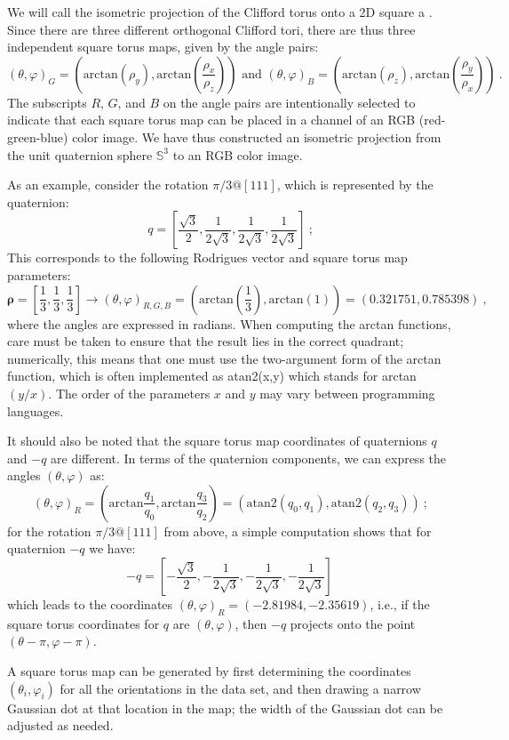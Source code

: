 We will call the isometric projection of the Clifford torus onto a 2D square a .  Since there are three different orthogonal Clifford tori, there are thus three independent square torus maps, given by the angle pairs:
\begin{equation}
	(\theta,\varphi)_G = \left(\text{arctan}(\rho_y), \text{arctan}\left(\frac{\rho_x}{\rho_z}\right)\right)\text{ and }(\theta,\varphi)_B = \left(\text{arctan}(\rho_z), \text{arctan}\left(\frac{\rho_y}{\rho_x}\right)\right)\ .
\end{equation}
The subscripts $R$, $G$, and $B$ on the angle pairs are intentionally selected to indicate that each square torus map can be placed in a channel of an RGB (red-green-blue) color image. We have thus constructed an isometric projection from the unit quaternion sphere $\mathbb{S}^3$ to an RGB color image.

As an example, consider the rotation $\pi/3@[111]$, which is represented by the quaternion:
\[
	q=\left[\frac{\sqrt{3}}{2},\frac{1}{2\sqrt{3}},\frac{1}{2\sqrt{3}},\frac{1}{2\sqrt{3}}\right]\ ;
\]
This corresponds to the following Rodrigues vector and square torus map parameters:
\[
	\bm{\rho}=\left[\frac{1}{3},\frac{1}{3},\frac{1}{3}\right]\rightarrow 
	(\theta,\varphi)_{R,G,B} = \left(\text{arctan}\left(\frac{1}{3}\right),\text{arctan}\left(1\right)\right)= (0.321751 , 0.785398)\ ,
\]
where the angles are expressed in radians. When computing the arctan functions, care must be taken to ensure that the result lies in the correct quadrant; numerically, this means that one must use the two-argument form of the arctan function, which is often implemented as \textsf{atan2(x,y)} which stands for arctan$(y/x)$.  The order of the parameters $x$ and $y$ may vary between programming languages.  

It should also be noted that the square torus map coordinates of quaternions $q$ and $-q$ are different.  In terms of the quaternion components, we can express the angles $(\theta,\varphi)$ as:
\[
	(\theta,\varphi)_R = \left(\text{arctan}\frac{q_1}{q_0},\text{arctan}\frac{q_3}{q_2}\right) = \left(\text{atan2}(q_0,q_1),\text{atan2}(q_2,q_3)\right)\ ;
\]
for the rotation $\pi/3@[111]$ from above, a simple computation shows that for quaternion $-q$ we have:
\[
	-q=\left[-\frac{\sqrt{3}}{2},-\frac{1}{2\sqrt{3}},-\frac{1}{2\sqrt{3}},-\frac{1}{2\sqrt{3}}\right]\ 
\]
which leads to the coordinates $(\theta,\varphi)_R=(-2.81984,-2.35619)$, i.e., if the square torus coordinates for $q$ are $(\theta,\varphi)$, then $-q$ projects onto the point $(\theta-\pi,\varphi-\pi)$.

A square torus map can be generated by first determining the coordinates $(\theta_i,\varphi_i)$ for all the orientations in the data set, and then drawing a narrow Gaussian dot at that location in the map; the width of the Gaussian dot can be adjusted as needed. 






